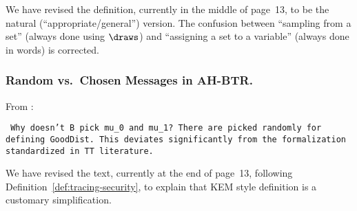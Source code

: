 We have revised the definition,
currently in the middle of page~13,
to be the natural (``appropriate/general'') version.
The confusion between
``sampling from a set'' (always done using $\draws$) and
``assigning a set to a variable'' (always done in words) is corrected.

\subsubsection{Random vs.\ Chosen Messages in AH-BTR.}
From :

\texttt{
Why doesn't B pick mu\_0 and mu\_1? There are picked randomly for \\
defining GoodDist. This deviates significantly from the formalization \\
standardized in TT literature.
}

We have revised the text, currently at the end of page~13,
following Definition~\ref{def:tracing-security},
to explain that KEM style definition is a customary simplification.
